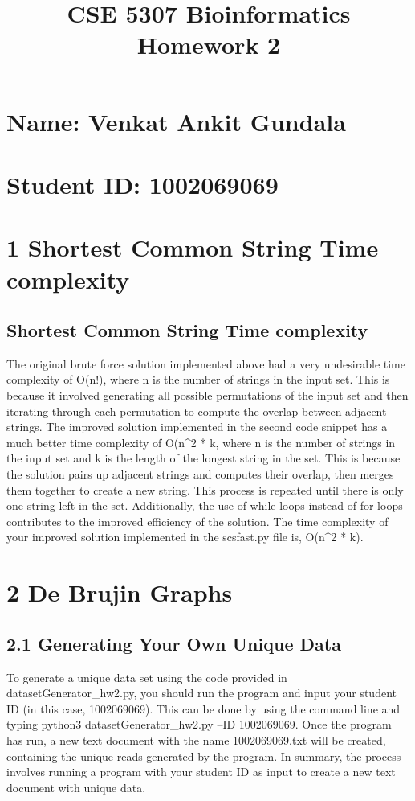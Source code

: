 \documentclass{article}
\title{\textbf{CSE 5307 Bioinformatics Homework 2}}
\date{}
\begin{document}
\maketitle
\section*{Name: Venkat Ankit Gundala}
\section*{Student ID: 1002069069}\bigskip


\section*{1 Shortest Common String Time complexity}

\subsection*{Shortest Common String Time complexity}
\newline The original brute force solution implemented above had a very undesirable time complexity of O(n!), where n is the number of strings in the input set. This is because it involved generating all possible permutations of the input set and then iterating through each permutation to compute the overlap between adjacent strings.
The improved solution implemented in the second code snippet has a much better time complexity of O(n^2 * k\), where n is the number of strings in the input set and k is the length of the longest string in the set. This is because the solution pairs up adjacent strings and computes their overlap, then merges them together to create a new string. This process is repeated until there is only one string left in the set. Additionally, the use of while loops instead of for loops contributes to the improved efficiency of the solution.
\newline The time complexity of your improved solution implemented in the scsfast.py file is, O(n^2 * k\)).

\section*{2 De Brujin Graphs}
  \subsection*{2.1 Generating Your Own Unique Data }
\newline To generate a unique data set using the code provided in datasetGenerator\_hw2.py, you should run the program and input your student ID (in this case, 1002069069).
\newline This can be done by using the command line and typing python3 datasetGenerator\_hw2.py --ID 1002069069.
\newline Once the program has run, a new text document with the name 1002069069.txt will be created, containing the unique reads generated by the program. In summary, the process involves running a program with your student ID as input to create a new text document with unique data.
\end{document}
